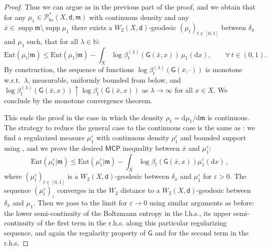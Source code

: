 \documentclass[11pt,a4paper]{article}
\theoremstyle{plain}
\theoremstyle{definition}
\theoremstyle{remark}
\numberwithin{equation}{section}
\newcommand{\N}{\mathbb{N}} %
\DeclareMathOperator{\supp}{\mathrm{supp}}
\newcommand{\ve}{\varepsilon}
\newcommand{\MCP}{\mathsf{MCP}}
\newcommand{\Ent}{\mathrm{Ent}}
\newcommand{\Prob}{\mathcal{P}}
\newcommand{\eps}{\varepsilon}
\newcommand{\di}{\mathrm{d}}
\newcommand{\mm}{\mathfrak m}
\newcommand{\sfd}{\mathsf d}
\newcommand{\sfG}{\mathsf G}
\begin{document}
\begin{proof}
Thus we can argue as in the previous part of the proof, and we obtain that for any $\mu_1\in \Prob_{bs}^{*}(X,\sfd,\mm)$ with continuous density and any $\bar{x}\in \supp\mm\setminus \supp\mu_1$    there exists a $W_2(X,\sfd)$-geodesic $(\mu_t)_{t\in[0,1]}$ between $\delta_{\bar{x}}$ and $\mu_1$ such, that for all $\lambda\in \N$:
\begin{equation}
\Ent(\mu_t|\mm)\leq \Ent(\mu_1|\mm)-\int_X \log\beta_t^{(\lambda)}(\sfG(\bar{x},x))\,\mu_1(\di x), \qquad\forall\, t\in(0,1).
\end{equation}
By construction, the sequence of functions $\log\beta_t^{(\lambda)}(\sfG(\bar{x},\cdot))$ is monotone w.r.t.\ $\lambda$, measurable, uniformly bounded from below, and $\log\beta_t^{(\lambda)}(\sfG(\bar{x},x))\uparrow \log\beta_t(\sfG(\bar{x},x))$ as $\lambda \to \infty$ for all $x\in X$. We conclude by the monotone convergence theorem.


This ends the proof in the case in which the density $\rho_1=\di \mu_1/\di \mm$ is continuous. The strategy to reduce the general case to the continuous case is the same as \cite{Vil}: we find a regularized measure $\mu_1^\ve$ with continuous density $\rho_1^\ve$ and bounded support using \cite[Ch.\ 29, First Appendix]{Vil}, and we prove the desired $\MCP$ inequality between $\bar{x}$ and $\mu_1^\ve$:
\begin{equation}
\Ent(\mu_{t}^\eps|\mm)\leq \Ent(\mu_{1}^\eps|\mm) - \int_{X} \log\beta_t(\sfG(\bar{x},x))\mu_{1}^\eps(\di x)\, ,
\end{equation}
where $(\mu_t^\eps)_{t\in[0,1]}$ is a $W_2(X,\sfd)$-geodesic between $\delta_{\bar{x}}$ and $\mu_1^\ve$ for $\ve>0$. The sequence $(\mu_t^\ve)_\ve$ converges in the $W_2$ distance to a $W_2(X,\sfd)$-geodesic between $\delta_{\bar{x}}$ and $\mu_1$. Then we pass to the limit for $\ve \to 0$ using similar arguments as before: the lower semi-continuity of the Boltzmann entropy in the l.h.s., its upper semi-continuity of the first term in the r.h.s. along this particular regularizing sequence, and again the regularity property of $\sfG$ and \cite[Cor.\ 2.2.10]{Bogachev-Weak} for the second term in the r.h.s.
\end{proof}
\end{document}

